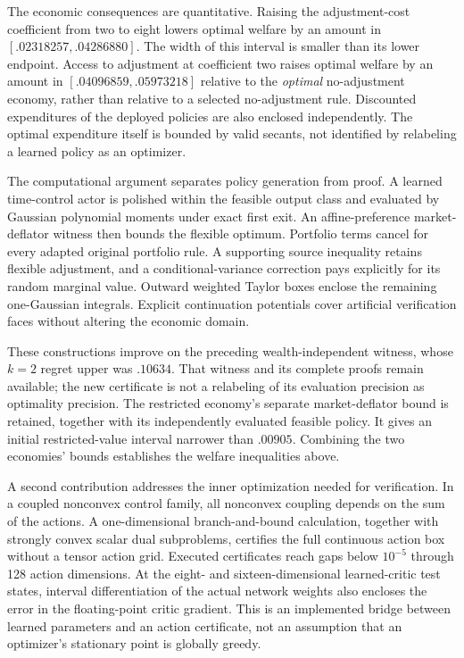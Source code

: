 The economic consequences are quantitative. Raising the adjustment-cost coefficient from two to eight lowers optimal welfare by an amount in $[.02318257,.04286880]$. The width of this interval is smaller than its lower endpoint. Access to adjustment at coefficient two raises optimal welfare by an amount in $[.04096859,.05973218]$ relative to the \emph{optimal} no-adjustment economy, rather than relative to a selected no-adjustment rule. Discounted expenditures of the deployed policies are also enclosed independently. The optimal expenditure itself is bounded by valid secants, not identified by relabeling a learned policy as an optimizer.

The computational argument separates policy generation from proof. A learned time-control actor is polished within the feasible output class and evaluated by Gaussian polynomial moments under exact first exit. An affine-preference market-deflator witness then bounds the flexible optimum. Portfolio terms cancel for every adapted original portfolio rule. A supporting source inequality retains flexible adjustment, and a conditional-variance correction pays explicitly for its random marginal value. Outward weighted Taylor boxes enclose the remaining one-Gaussian integrals. Explicit continuation potentials cover artificial verification faces without altering the economic domain.

These constructions improve on the preceding wealth-independent witness, whose $k=2$ regret upper was $.10634$. That witness and its complete proofs remain available; the new certificate is not a relabeling of its evaluation precision as optimality precision. The restricted economy's separate market-deflator bound is retained, together with its independently evaluated feasible policy. It gives an initial restricted-value interval narrower than $.00905$. Combining the two economies' bounds establishes the welfare inequalities above.

A second contribution addresses the inner optimization needed for verification. In a coupled nonconvex control family, all nonconvex coupling depends on the sum of the actions. A one-dimensional branch-and-bound calculation, together with strongly convex scalar dual subproblems, certifies the full continuous action box without a tensor action grid. Executed certificates reach gaps below $10^{-5}$ through 128 action dimensions. At the eight- and sixteen-dimensional learned-critic test states, interval differentiation of the actual network weights also encloses the error in the floating-point critic gradient. This is an implemented bridge between learned parameters and an action certificate, not an assumption that an optimizer's stationary point is globally greedy.


